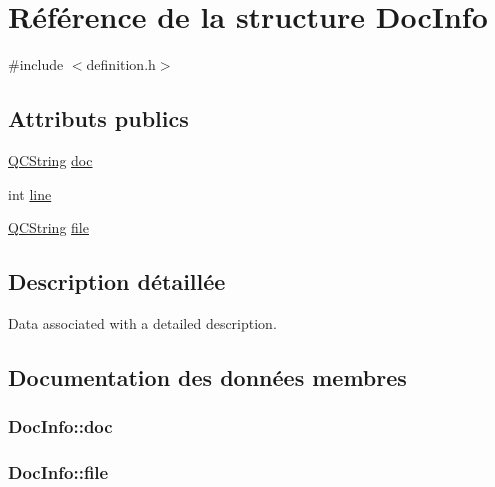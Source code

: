 \hypertarget{struct_doc_info}{}\section{Référence de la structure Doc\+Info}
\label{struct_doc_info}


{\ttfamily \#include $<$definition.\+h$>$}

\subsection*{Attributs publics}
\begin{DoxyCompactItemize}
\item 
\hyperlink{class_q_c_string}{Q\+C\+String} \hyperlink{struct_doc_info_a543c5554fb4ecb5b71acd47f6ea39374}{doc}
\item 
int \hyperlink{struct_doc_info_aa2776b16e60d965359c3c950cd08cf7d}{line}
\item 
\hyperlink{class_q_c_string}{Q\+C\+String} \hyperlink{struct_doc_info_ab1a7c311382d55b036dc8731428e0765}{file}
\end{DoxyCompactItemize}


\subsection{Description détaillée}
Data associated with a detailed description. 

\subsection{Documentation des données membres}
\hypertarget{struct_doc_info_a543c5554fb4ecb5b71acd47f6ea39374}{}
\subsubsection[{doc}]{ Doc\+Info\+::doc}\label{struct_doc_info_a543c5554fb4ecb5b71acd47f6ea39374}
\hypertarget{struct_doc_info_ab1a7c311382d55b036dc8731428e0765}{}
\subsubsection[{file}]{ Doc\+Info\+::file}\label{struct_doc_info_ab1a7c311382d55b036dc8731428e0765}
\hypertarget{struct_doc_info_aa2776b16e60d965359c3c950cd08cf7d}{}
